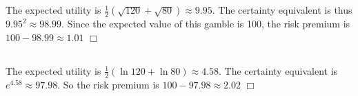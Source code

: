 \documentclass{article}
\begin{document}
\section{}
\subsection{}
The expected utility is $\frac{1}{2} \left( \sqrt{120} + \sqrt{80} \right) \approx 9.95$. The certainty equivalent is thus $9.95^2 \approx 98.99$. Since the expected value of this gamble is 100, the risk premium is $100 - 98.99 \approx 1.01$ $\Box$

\subsection{}
The expected utility is $\frac{1}{2} \left( \ln 120 + \ln 80 \right) \approx 4.58$. The certainty equivalent is $e^{4.58} \approx 97.98$. So the risk premium is $100 - 97.98 \approx 2.02$ $\Box$
\end{document}
